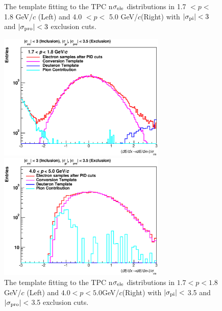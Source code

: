 {\begin{figure}[!h]
\begin{minipage}{0.5\hsize}
\begin{center}
  \end{center}
 \end{minipage}
  \caption{The template fitting to the TPC n$\sigma_{\rm{ele}}$ distributions in 1.7 $<p<$ 1.8 GeV/$c$ (Left) and 4.0 $<p<$ 5.0 GeV/$c$(Right) with $|\sigma_{\rm{pi}}|<3$ and $|\sigma_{\rm{pro}}|<3$ exclusion cuts.}
  \label{fig_4_tpcnsigmacut3}
\end{figure}
\begin{figure}[!h]
 \begin{minipage}{0.5\hsize}
  \begin{center}
 	\includegraphics[width=8cm]{chap4/figure/PID/TPCNSigma_AfterExclusion3p5_MB_1p7_1p8.eps}
  \end{center}
 \end{minipage}
 \begin{minipage}{0.5\hsize}
  \begin{center}
	 \includegraphics[width=8cm]{chap4/figure/PID/TPCNSigma_AfterExclusion3p5_MB_4_5.eps}
  \end{center}
 \end{minipage}
   \caption{The template fitting to the TPC n$\sigma_{\rm{ele}}$ distributions in $1.7<p<1.8$ GeV/$c$ (Left) and $4.0<p<5.0$GeV/$c$(Right) with $|\sigma_{\rm{pi}}|<$ 3.5 and $|\sigma_{\rm{pro}}| < $ 3.5 exclusion cuts.}
  \label{fig_4_tpcnsigmacut3p5}
\end{figure}

}
